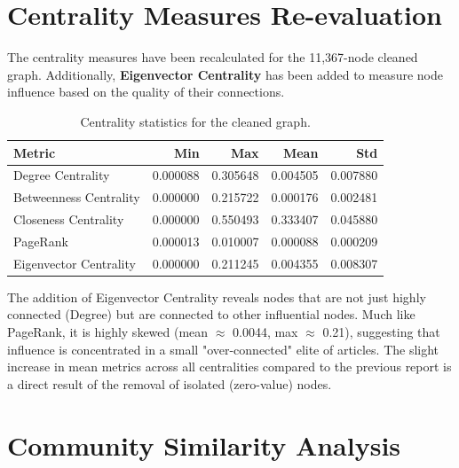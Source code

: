 \documentclass[12pt,a4paper]{article}
\begin{document}
\section{Centrality Measures Re-evaluation}

The centrality measures have been recalculated for the 11,367-node cleaned graph. Additionally, \textbf{Eigenvector Centrality} has been added to measure node influence based on the quality of their connections.

\begin{table}[H]
\centering
\caption{Centrality statistics for the cleaned graph.}
\label{tab:centrality_new}
\begin{tabular}{lrrrr}
\toprule
\textbf{Metric} & \textbf{Min} & \textbf{Max} & \textbf{Mean} & \textbf{Std} \\
\midrule
Degree Centrality & 0.000088 & 0.305648 & 0.004505 & 0.007880 \\
Betweenness Centrality & 0.000000 & 0.215722 & 0.000176 & 0.002481 \\
Closeness Centrality & 0.000000 & 0.550493 & 0.333407 & 0.045880 \\
PageRank & 0.000013 & 0.010007 & 0.000088 & 0.000209 \\
Eigenvector Centrality & 0.000000 & 0.211245 & 0.004355 & 0.008307 \\
\bottomrule
\end{tabular}
\end{table}

The addition of Eigenvector Centrality reveals nodes that are not just highly connected (Degree) but are connected to other influential nodes. Much like PageRank, it is highly skewed (mean $\approx$ 0.0044, max $\approx$ 0.21), suggesting that influence is concentrated in a small "over-connected" elite of articles. The slight increase in mean metrics across all centralities compared to the previous report is a direct result of the removal of isolated (zero-value) nodes.

\section{Community Similarity Analysis}
\end{document}
